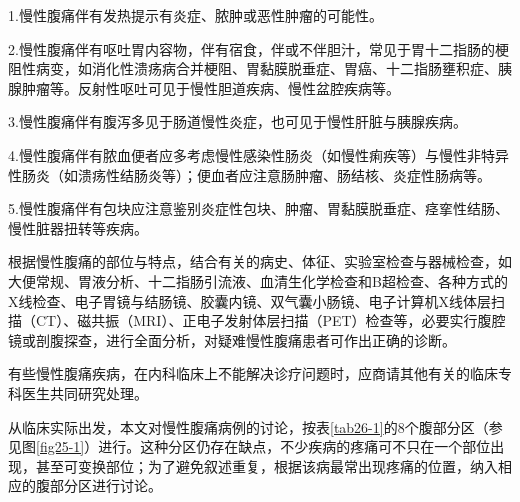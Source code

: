 1.慢性腹痛伴有发热提示有炎症、脓肿或恶性肿瘤的可能性。

2.慢性腹痛伴有呕吐胃内容物，伴有宿食，伴或不伴胆汁，常见于胃十二指肠的梗阻性病变，如消化性溃疡病合并梗阻、胃黏膜脱垂症、胃癌、十二指肠壅积症、胰腺肿瘤等。反射性呕吐可见于慢性胆道疾病、慢性盆腔疾病等。

3.慢性腹痛伴有腹泻多见于肠道慢性炎症，也可见于慢性肝脏与胰腺疾病。

4.慢性腹痛伴有脓血便者应多考虑慢性感染性肠炎（如慢性痢疾等）与慢性非特异性肠炎（如溃疡性结肠炎等）；便血者应注意肠肿瘤、肠结核、炎症性肠病等。

5.慢性腹痛伴有包块应注意鉴别炎症性包块、肿瘤、胃黏膜脱垂症、痉挛性结肠、慢性脏器扭转等疾病。

根据慢性腹痛的部位与特点，结合有关的病史、体征、实验室检查与器械检查，如大便常规、胃液分析、十二指肠引流液、血清生化学检查和B超检查、各种方式的X线检查、电子胃镜与结肠镜、胶囊内镜、双气囊小肠镜、电子计算机X线体层扫描（CT）、磁共振（MRI）、正电子发射体层扫描（PET）检查等，必要实行腹腔镜或剖腹探查，进行全面分析，对疑难慢性腹痛患者可作出正确的诊断。

有些慢性腹痛疾病，在内科临床上不能解决诊疗问题时，应商请其他有关的临床专科医生共同研究处理。

从临床实际出发，本文对慢性腹痛病例的讨论，按表\ref{tab26-1}的8个腹部分区（参见图\ref{fig25-1}）进行。这种分区仍存在缺点，不少疾病的疼痛可不只在一个部位出现，甚至可变换部位；为了避免叙述重复，根据该病最常出现疼痛的位置，纳入相应的腹部分区进行讨论。

